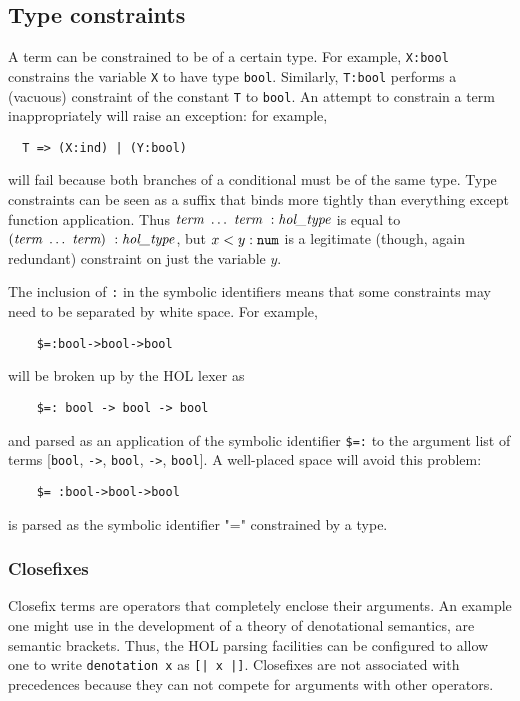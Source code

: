 \documentclass[12pt,fleqn,a4paper]{report}
\newcommand{\type}       {\mbox{\it hol\_type}}
\newcommand{\term}       {\mbox{\it term}}
\begin{document}
\subsection{Type constraints}

A term can be constrained to be of a certain type.  For example,
\verb+X:bool+ constrains the variable \verb+X+ to have type
\verb+bool+. Similarly, \verb+T:bool+ performs a (vacuous) constraint
of the constant \verb+T+ to \verb+bool+. An attempt to constrain a
term inappropriately will raise an exception: for example,
\begin{verbatim}
  T => (X:ind) | (Y:bool)
\end{verbatim}
will fail because both branches of a conditional must be of the same
type.  Type constraints can be seen as a suffix that binds more
tightly than everything except function application.  Thus $\term\
\ldots\ \term \ : \type$ is equal to $(\term\ \ldots\ \term)\ :
\type$, but $x < y:\mbox{\tt num}$ is a legitimate (though, again
redundant) constraint on just the variable $y$.

The inclusion of \verb+:+ in the symbolic identifiers means that some
constraints may need to be separated by white space. For example,
\begin{verbatim}
    $=:bool->bool->bool
\end{verbatim}
will be broken up by the HOL lexer as
\begin{verbatim}
    $=: bool -> bool -> bool
\end{verbatim}
and parsed as an application of the symbolic identifier \verb+$=:+ to
the argument list of terms [\verb+bool+, \verb+->+, \verb+bool+,
\verb+->+, \verb+bool+]. A well-placed space will avoid this problem:
\begin{verbatim}
    $= :bool->bool->bool
\end{verbatim}
is parsed as the symbolic identifier "=" constrained by a type.

\subsubsection{Closefixes}

Closefix terms are operators that completely enclose their arguments.
An example one might use in the development of a theory of
denotational semantics, are semantic brackets.  Thus, the HOL parsing
facilities can be configured to allow one to write {\tt denotation x}
as {\tt [| x |]}.  Closefixes are not associated with precedences
because they can not compete for arguments with other operators.
\end{document}
